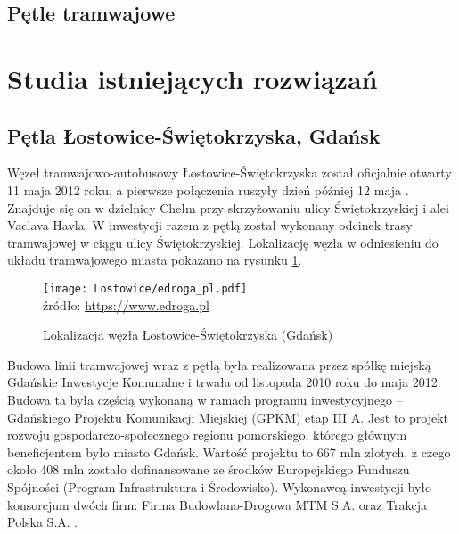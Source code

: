 \documentclass[twoside,12pt]{article}
\begin{document}
	\subsection{Pętle tramwajowe}
	
	\section{Studia istniejących rozwiązań}
	
	\clearpage
	\subsection{Pętla Łostowice-Świętokrzyska, Gdańsk}
	
	Węzeł tramwajowo-autobusowy Łostowice-Świętokrzyska został oficjalnie otwarty 11 maja 2012 roku, a pierwsze połączenia ruszyły dzień później 12 maja \cite{gazeta_gdansk}. Znajduje się on w dzielnicy Chełm przy skrzyżowaniu ulicy Świętokrzyskiej i alei Vaclava Havla. W inwestycji razem z pętlą został wykonany odcinek trasy tramwajowej w ciągu ulicy Świętokrzyskiej. Lokalizację węzła w odniesieniu do układu tramwajowego miasta pokazano na rysunku \ref{lostowice1}.
	
	\begin{figure}[H]
		\centering
		\caption{Lokalizacja węzła Łostowice-Świętokrzyska (Gdańsk)}
		\texttt{[image: Lostowice/edroga\_pl.pdf]}\\
		\footnotesize{źródło: \url{https://www.edroga.pl}}
		\label{lostowice1}
	\end{figure}
	
	Budowa linii tramwajowej wraz z pętlą była realizowana przez spółkę miejską Gdańskie Inwestycje Komunalne i trwała od listopada 2010 roku do maja 2012. Budowa ta była częścią wykonaną w ramach programu inwestycyjnego -- Gdańskiego Projektu Komunikacji Miejskiej (GPKM) etap III A. Jest to projekt rozwoju gospodarczo-społecznego regionu pomorskiego, którego głównym beneficjentem było miasto Gdańsk. Wartość projektu to 667 mln złotych, z czego około 408 mln zostało dofinansowane ze środków Europejskiego Funduszu Spójności (Program Infrastruktura i Środowisko). Wykonawcą inwestycji było konsorcjum dwóch firm: Firma Budowlano-Drogowa MTM S.A. oraz Trakcja Polska S.A. \cite{portal_gdansk}. 
	
\end{document}
